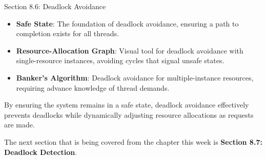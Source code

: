 \begin{notes}{Section 8.6: Deadlock Avoidance}
\begin{highlight}
    \end{highlight}
    
    \begin{highlight}
    
        \begin{itemize}
            \item \textbf{Safe State}: The foundation of deadlock avoidance, ensuring a path to completion exists for all threads.
            \item \textbf{Resource-Allocation Graph}: Visual tool for deadlock avoidance with single-resource instances, avoiding cycles that signal unsafe states.
            \item \textbf{Banker's Algorithm}: Deadlock avoidance for multiple-instance resources, requiring advance knowledge of thread demands.
        \end{itemize}
    
    By ensuring the system remains in a safe state, deadlock avoidance effectively prevents deadlocks while dynamically adjusting resource allocations as requests are made.
    
    \end{highlight}
\end{notes}

The next section that is being covered from the chapter this week is \textbf{Section 8.7: Deadlock Detection}.

